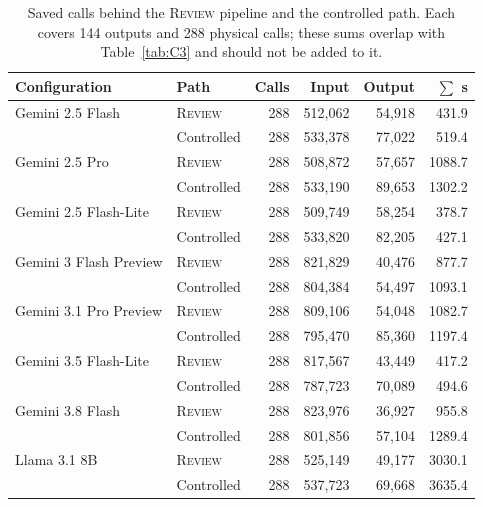 \documentclass[acmsmall,review]{acmart}
\newcommand{\review}{\textsc{Review}}
\begin{document}
\begin{table}[H]
\centering
\caption{Saved calls behind the \review{} pipeline and the controlled path. Each covers 144 outputs and 288 physical calls; these sums overlap with Table~\ref{tab:C3} and should not be added to it.}\label{tab:C4}
\small
\setlength{\tabcolsep}{4pt}
\begin{tabular}{@{}llrrrr@{}}
\toprule
\textbf{Configuration} & \textbf{Path} & \textbf{Calls} & \textbf{Input} & \textbf{Output} & \textbf{$\sum$ s} \\
\midrule
Gemini 2.5 Flash & \review{} & 288 & 512,062 & 54,918 & 431.9 \\
 & Controlled & 288 & 533,378 & 77,022 & 519.4 \\
Gemini 2.5 Pro & \review{} & 288 & 508,872 & 57,657 & 1088.7 \\
 & Controlled & 288 & 533,190 & 89,653 & 1302.2 \\
Gemini 2.5 Flash-Lite & \review{} & 288 & 509,749 & 58,254 & 378.7 \\
 & Controlled & 288 & 533,820 & 82,205 & 427.1 \\
Gemini 3 Flash Preview & \review{} & 288 & 821,829 & 40,476 & 877.7 \\
 & Controlled & 288 & 804,384 & 54,497 & 1093.1 \\
Gemini 3.1 Pro Preview & \review{} & 288 & 809,106 & 54,048 & 1082.7 \\
 & Controlled & 288 & 795,470 & 85,360 & 1197.4 \\
Gemini 3.5 Flash-Lite & \review{} & 288 & 817,567 & 43,449 & 417.2 \\
 & Controlled & 288 & 787,723 & 70,089 & 494.6 \\
Gemini 3.8 Flash & \review{} & 288 & 823,976 & 36,927 & 955.8 \\
 & Controlled & 288 & 801,856 & 57,104 & 1289.4 \\
Llama 3.1 8B & \review{} & 288 & 525,149 & 49,177 & 3030.1 \\
 & Controlled & 288 & 537,723 & 69,668 & 3635.4 \\
\bottomrule
\end{tabular}
\end{table}

\FloatBarrier
\setcounter{figure}{0}\setcounter{table}{0}
\renewcommand{\thefigure}{D\arabic{figure}}
\renewcommand{\thetable}{D\arabic{table}}
\end{document}

